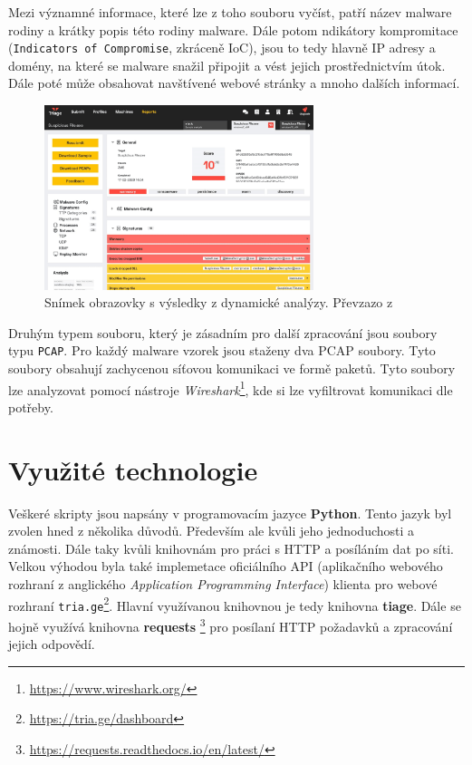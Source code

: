 Mezi významné informace, které lze z toho souboru vyčíst, patří název malware rodiny a krátky popis této rodiny malware. Dále potom ndikátory kompromitace (\texttt{Indicators of Compromise}, zkráceně IoC), 
jsou to tedy hlavně IP adresy a domény, na které se malware snažil připojit a vést jejich prostřednictvím útok. Dále poté může obsahovat navštívené webové stránky a mnoho dalších informací.

\begin{figure}[h]
	\centering
        \includegraphics[width=0.7\textwidth]{obrazky/3-triage-report.png}
	\caption{Snímek obrazovky s výsledky z dynamické analýzy. Převzazo z \cite{hatching}}
    \label{Report_image}
\end{figure}

Druhým typem souboru, který je zásadním pro další zpracování jsou soubory typu \texttt{PCAP}. Pro každý malware vzorek jsou staženy dva PCAP soubory.
Tyto soubory obsahují zachycenou síťovou komunikaci ve formě paketů. Tyto soubory lze analyzovat pomocí nástroje \textit{Wireshark}\footnote{\href{https://www.wireshark.org/}{https://www.wireshark.org/}}, 
kde si lze vyfiltrovat komunikaci dle potřeby.

\newpage
\section{Využité technologie}

Veškeré skripty jsou napsány v programovacím jazyce \textbf{Python}. Tento jazyk byl zvolen hned z několika důvodů.
Především ale kvůli jeho jednoduchosti a známosti. Dále taky kvůli knihovnám pro práci s HTTP a posíláním dat po síti.
Velkou výhodou byla také implemetace oficiálního API (aplikačního webového rozhraní z anglického \textit{Application Programming Interface}) klienta pro webové rozhraní 
\texttt{tria.ge}\footnote{\href{https://tria.ge/dashboard}{https://tria.ge/dashboard}}. 
Hlavní využívanou knihovnou je tedy knihovna \textbf{tiage}. Dále se hojně využívá knihovna \textbf{requests} \footnote{\href{https://requests.readthedocs.io/en/latest/}{https://requests.readthedocs.io/en/latest/}}
pro posílaní HTTP požadavků a zpracování jejich odpovědí.

